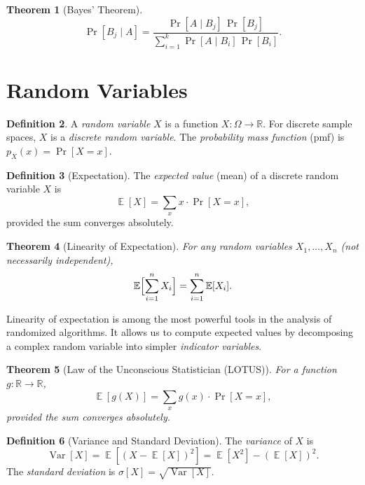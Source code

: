 \documentclass[twoside,12pt]{book}
\theoremstyle{plain}
\newtheorem{theorem}{Theorem}[chapter]
\theoremstyle{definition}
\newtheorem{definition}[theorem]{Definition}
\theoremstyle{remark}
\newcommand{\Exp}{\operatorname{\mathbb{E}}}
\newcommand{\Var}{\operatorname{Var}}
\begin{document}
\begin{theorem}[Bayes' Theorem]
\[
\Pr[B_j \mid A] = \frac{\Pr[A \mid B_j]\,\Pr[B_j]}{\displaystyle \sum_{i=1}^{k} \Pr[A \mid B_i]\,\Pr[B_i]}.
\]
\end{theorem}

\section{Random Variables}
\label{app:sec:random-variables}

\begin{definition}
A \emph{random variable} $X$ is a function $X: \Omega \to \mathbb{R}$.
For discrete sample spaces, $X$ is a \emph{discrete random variable}.
The \emph{probability mass function} (pmf) is
$p_X(x) = \Pr[X = x]$.
\end{definition}

\begin{definition}[Expectation]
The \emph{expected value} (mean) of a discrete random variable $X$ is
\[
\Exp[X] = \sum_{x} x \cdot \Pr[X = x],
\]
provided the sum converges absolutely.
\end{definition}

\begin{theorem}[Linearity of Expectation]
For any random variables $X_1, \ldots, X_n$ (not necessarily independent),
\[
\Exp\Bigl[\sum_{i=1}^{n} X_i\Bigr] = \sum_{i=1}^{n} \Exp[X_i].
\]
\end{theorem}

Linearity of expectation is among the most powerful tools in the analysis
of randomized algorithms. It allows us to compute expected values by
decomposing a complex random variable into simpler \emph{indicator
variables}.

\begin{theorem}[Law of the Unconscious Statistician (LOTUS)]
For a function $g: \mathbb{R} \to \mathbb{R}$,
\[
\Exp[g(X)] = \sum_{x} g(x) \cdot \Pr[X = x],
\]
provided the sum converges absolutely.
\end{theorem}

\begin{definition}[Variance and Standard Deviation]
The \emph{variance} of $X$ is
\[
\Var[X] = \Exp[(X - \Exp[X])^2] = \Exp[X^2] - (\Exp[X])^2.
\]
The \emph{standard deviation} is $\sigma[X] = \sqrt{\Var[X]}$.
\end{definition}
\end{document}
